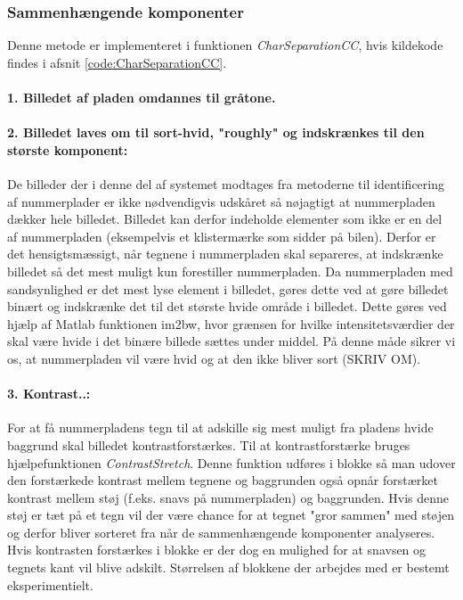 \subsubsection*{Sammenhængende komponenter}

Denne metode er implementeret i funktionen \textit{CharSeparationCC}, hvis kildekode findes i afsnit \vref{code:CharSeparationCC}.

\paragraph{1. Billedet af pladen omdannes til gråtone.}

\paragraph{2. Billedet laves om til sort-hvid, "roughly" og indskrænkes til den største komponent:}
De billeder der i denne del af systemet modtages fra metoderne til identificering af nummerplader er ikke nødvendigvis udskåret så nøjagtigt at nummerpladen dækker hele billedet. Billedet kan derfor indeholde elementer som ikke er en del af nummerpladen (eksempelvis et klistermærke som sidder på bilen). Derfor er det hensigtsmæssigt, når tegnene i nummerpladen skal separeres, at indskrænke billedet så det mest muligt kun forestiller nummerpladen. Da nummerpladen med sandsynlighed er det mest lyse element i billedet, gøres dette ved at gøre billedet binært og indskrænke det til det største hvide område i billedet. Dette gøres ved hjælp af Matlab funktionen im2bw, hvor grænsen for hvilke intensitetsværdier der skal være hvide i det binære billede sættes under middel. På denne måde sikrer vi os, at nummerpladen vil være hvid og at den ikke bliver sort (SKRIV OM).

\paragraph{3. Kontrast..:}
For at få nummerpladens tegn til at adskille sig mest muligt fra pladens hvide baggrund skal billedet kontrastforstærkes. Til at kontrastforstærke bruges hjælpefunktionen \textit{ContrastStretch}. Denne funktion udføres i blokke så man udover den forstærkede kontrast mellem tegnene og baggrunden også opnår forstærket kontrast mellem støj (f.eks. snavs på nummerpladen) og baggrunden. Hvis denne støj er tæt på et tegn vil der være chance for at tegnet "gror sammen" med støjen og derfor bliver sorteret fra når de sammenhængende komponenter analyseres. Hvis kontrasten forstærkes i blokke er der dog en mulighed for at snavsen og tegnets kant vil blive adskilt. Størrelsen af blokkene der arbejdes med er bestemt eksperimentielt.

